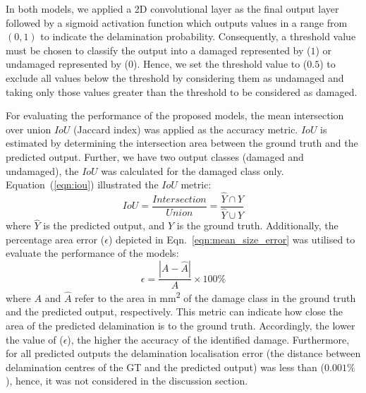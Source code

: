 In both models, we applied a 2D convolutional layer as the final output layer followed by a sigmoid activation function which outputs values in a range from \((0,1)\) to indicate the delamination probability.
Consequently, a threshold value must be chosen to classify the output into a damaged represented by (\(1\)) or undamaged represented by (\(0\)).
Hence, we set the threshold value to (\(0.5\)) to exclude all values below the threshold by considering them as undamaged and taking only those values greater than the threshold to be considered as damaged.

For evaluating the performance of the proposed models, the mean 
intersection over union \(IoU\) (Jaccard index) was applied as the accuracy metric. 
\(IoU\) is estimated by determining the intersection
area between the ground truth and the predicted output. 
Further, we have two output classes (damaged and undamaged), the \(IoU\) was calculated for the damaged class only. 
Equation~(\ref{eqn:iou}) illustrated the \(IoU\) metric: 
\begin{equation}
	IoU=\frac{Intersection}{Union}=\frac{\hat{Y} \cap Y}{\hat{Y} \cup Y}
	\label{eqn:iou}
\end{equation}
where \(\hat{Y}\) is the predicted output, and \(Y\) is the ground truth.
Additionally, the percentage area error ($\epsilon$) depicted in Eqn.~\ref{eqn:mean_size_error} was utilised to evaluate the performance of the models:
\begin{equation}
	\epsilon=\frac{|A-\hat{A}|}{A} \times 100\%
	\label{eqn:mean_size_error}
\end{equation}
where \(A\) and \(\hat{A}\) refer to the area in mm\textsuperscript{2} of the damage class in the ground truth and the predicted output, respectively.
This metric can indicate how close the area of the predicted delamination is to the ground truth.
Accordingly, the lower the value of ($\epsilon$), the higher the accuracy of the identified damage. 
Furthermore, for all predicted outputs the delamination localisation error (the distance between delamination centres of the GT and the predicted output) was less than (\(0.001\%\)), hence, it was not considered in the discussion section.
